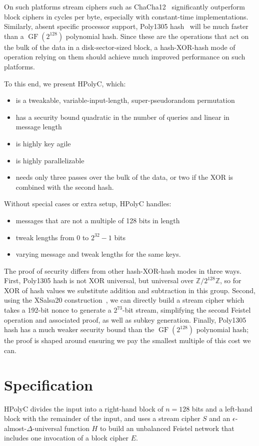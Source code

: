 \documentclass[letterpaper,luatex,11pt]{article}
\DeclareMathOperator{\GF}{GF}
\begin{document}
On such platforms stream ciphers such as ChaCha12~\cite{chacha} significantly
outperform block ciphers in cycles per byte, especially with constant-time implementations.
Similarly, absent specific processor support, Poly1305 hash~\cite{poly1305} will be much faster
than a $\GF(2^{128})$ polynomial hash. Since these are the operations that act on the bulk of
the data in a disk-sector-sized block, a hash-XOR-hash
mode of operation relying on them should achieve
much improved performance on such platforms.

To this end, we present HPolyC, which:
\begin{itemize}
    \item is a tweakable, variable-input-length, super-pseudorandom permutation
    \item has a security bound quadratic in the number of queries and linear in message length
    \item is highly key agile
    \item is highly parallelizable
    \item needs only three passes over the bulk of the data, or
        two if the XOR is combined with the second hash.
\end{itemize}

Without special cases or extra setup, HPolyC handles:
\begin{itemize}
    \item messages that are not a multiple of 128 bits in length
    \item tweak lengths from 0 to $2^{32}-1$ bits
    \item varying message and tweak lengths for the same keys.
\end{itemize}

The proof of security differs from other hash-XOR-hash modes in three ways. First,
Poly1305 hash is not XOR universal, but universal over $\mathbb{Z}/2^{128}\mathbb{Z}$,
so for XOR of hash values we substitute addition and subtraction in this group.
Second, using the XSalsa20 construction~\cite{xsalsa}, we can directly
build a stream cipher which takes a 192-bit nonce to generate a $2^{73}$-bit stream, simplifying
the second Feistel operation and associated proof, as well as subkey generation.
Finally, Poly1305 hash has a much weaker security bound than the $\GF(2^{128})$ polynomial hash;
the proof is shaped around ensuring we pay the smallest multiple of this cost we can.

\section{Specification}
HPolyC divides the input into a right-hand block of $n = 128$ bits and a left-hand block with
the remainder of the input, and uses a stream cipher $S$ and an
$\epsilon$-almost-$\Delta$-universal
function $H$ to build an unbalanced Feistel network that includes one invocation of a
block cipher $E$.
\end{document}
